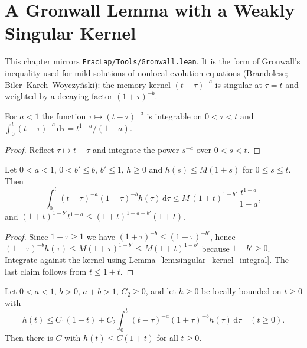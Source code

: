 \chapter{A Gronwall Lemma with a Weakly Singular Kernel}

This chapter mirrors \texttt{FracLap/Tools/Gronwall.lean}. It is the form of Gronwall's inequality used for mild solutions of nonlocal evolution equations (Brandolese; Biler--Karch--Woyczy\'nski): the memory kernel $(t - \tau)^{-a}$ is singular at $\tau = t$ and weighted by a decaying factor $(1 + \tau)^{-b}$.

\begin{lemma}\label{lem:singular_kernel_integral}
\leanok
For $a < 1$ the function $\tau \mapsto (t - \tau)^{-a}$ is integrable on $0 < \tau < t$ and $\int_0^t (t - \tau)^{-a}\, \mathrm{d}\tau = t^{1-a}/(1-a)$.
\end{lemma}

\begin{proof}
\leanok
Reflect $\tau \mapsto t - \tau$ and integrate the power $s^{-a}$ over $0 < s < t$.
\end{proof}

\begin{lemma}\label{lem:singular_integral_bound}
\leanok
Let $0 < a < 1$, $0 < b' \le b$, $b' \le 1$, $h \ge 0$ and $h(s) \le M(1 + s)$ for $0 \le s \le t$. Then
\[
  \int_0^t (t - \tau)^{-a} (1 + \tau)^{-b} h(\tau)\, \mathrm{d}\tau \le M\, (1 + t)^{1-b'}\, \frac{t^{1-a}}{1-a},
\]
and $(1 + t)^{1-b'} t^{1-a} \le (1 + t)^{1-a-b'} (1 + t)$.
\end{lemma}

\begin{proof}
\leanok
Since $1 + \tau \ge 1$ we have $(1 + \tau)^{-b} \le (1 + \tau)^{-b'}$, hence $(1 + \tau)^{-b} h(\tau) \le M (1 + \tau)^{1-b'} \le M (1 + t)^{1-b'}$ because $1 - b' \ge 0$. Integrate against the kernel using Lemma~\ref{lem:singular_kernel_integral}. The last claim follows from $t \le 1 + t$.
\end{proof}

\begin{theorem}\label{thm:gronwall_singular}
\leanok
Let $0 < a < 1$, $b > 0$, $a + b > 1$, $C_2 \ge 0$, and let $h \ge 0$ be locally bounded on $t \ge 0$ with
\[
  h(t) \le C_1 (1 + t) + C_2 \int_0^t (t - \tau)^{-a} (1 + \tau)^{-b} h(\tau)\, \mathrm{d}\tau \quad (t \ge 0).
\]
Then there is $C$ with $h(t) \le C (1 + t)$ for all $t \ge 0$.
\end{theorem}

